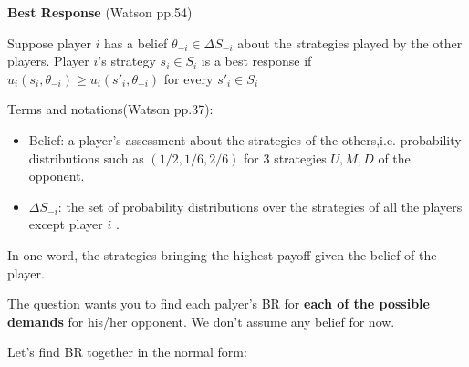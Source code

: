 \documentclass{article}
\begin{document}
\begin{mdframed}[backgroundcolor=blue!20,linecolor=white]
\textbf{Best Response} (Watson pp.54)

Suppose player $i$ has a belief $\theta_{−i} \in \Delta S_{−i}$ about the strategies played
by the other players. Player $i$'s strategy $s_i \in S_i$ is a best response if
$u_i (s_i , \theta_{−i} ) \ge u_i (s'_i , \theta_{−i})$ for every $s'_i \in S_i$

\vspace{4mm}

Terms and notations(Watson pp.37):
\begin{itemize}
\item Belief: a player's assessment about the strategies of the others,i.e. probability distributions such as $(1/2,1/6,2/6)$ for 3 strategies $U,M,D$ of the opponent.
\item $\Delta S_{−i}$: the set of probability distributions over the strategies of all the players except player $i$ .
\end{itemize}

In one word, the strategies bringing the highest payoff given the belief of the player.

\vspace{4mm}

The question wants you to find each palyer's  BR for \textbf{each of the possible demands} for his/her opponent.
We don't assume any belief for now.

\newpage

Let's find BR together in the normal form:


\end{mdframed}
\end{document}
